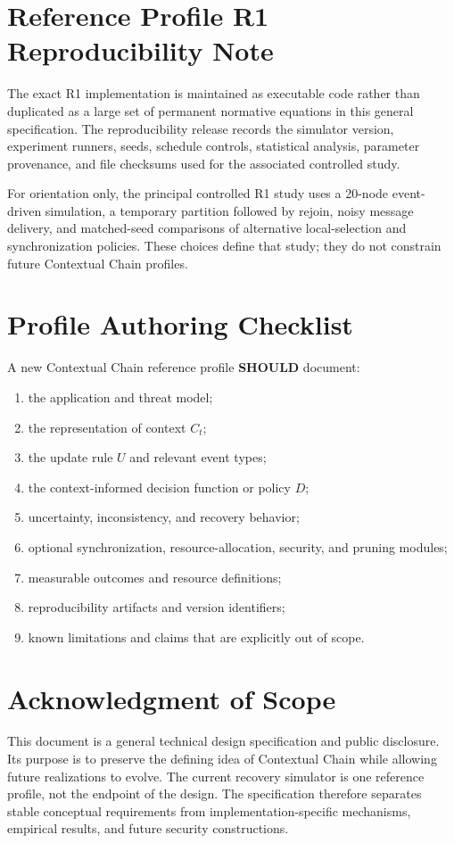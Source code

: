 \documentclass[11pt]{article}
\begin{document}
\appendix
\section{Reference Profile R1 Reproducibility Note}
The exact R1 implementation is maintained as executable code rather than duplicated as a large
set of permanent normative equations in this general specification. The reproducibility release
records the simulator version, experiment runners, seeds, schedule controls, statistical analysis,
parameter provenance, and file checksums used for the associated controlled study.

For orientation only, the principal controlled R1 study uses a 20-node event-driven simulation,
a temporary partition followed by rejoin, noisy message delivery, and matched-seed comparisons
of alternative local-selection and synchronization policies. These choices define that study; they
do not constrain future Contextual Chain profiles.

\section{Profile Authoring Checklist}
A new Contextual Chain reference profile \textbf{SHOULD} document:
\begin{enumerate}
  \item the application and threat model;
  \item the representation of context $C_t$;
  \item the update rule $U$ and relevant event types;
  \item the context-informed decision function or policy $D$;
  \item uncertainty, inconsistency, and recovery behavior;
  \item optional synchronization, resource-allocation, security, and pruning modules;
  \item measurable outcomes and resource definitions;
  \item reproducibility artifacts and version identifiers;
  \item known limitations and claims that are explicitly out of scope.
\end{enumerate}

\section*{Acknowledgment of Scope}
This document is a general technical design specification and public disclosure. Its purpose is
to preserve the defining idea of Contextual Chain while allowing future realizations to evolve.
The current recovery simulator is one reference profile, not the endpoint of the design. The
specification therefore separates stable conceptual requirements from implementation-specific
mechanisms, empirical results, and future security constructions.
\end{document}
